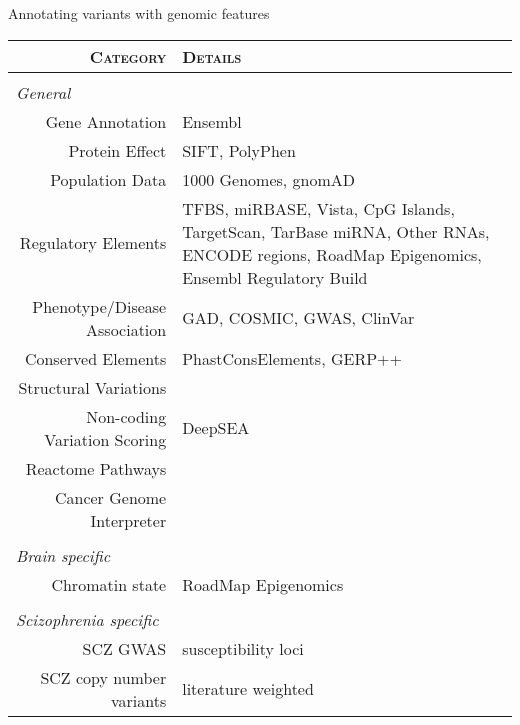 \documentclass[usenames,dvipsnames]{beamer}
\begin{document}
\begin{frame}[label=annotations]{Annotating variants with genomic features}
\tiny

\begin{tabular}{rp{2in}}
\scshape{Category} & \scshape{Details}\\
\hline
&\\
\multicolumn{2}{l}{\textit{General}} \\
\hline
\rowcolor{Yellow}
Gene Annotation & Ensembl\\
\rowcolor{Dandelion}
Protein Effect & SIFT, PolyPhen\\
\rowcolor{Yellow}
Population Data & 1000 Genomes, gnomAD\\
\rowcolor{Dandelion}
Regulatory Elements & TFBS, miRBASE, Vista, CpG Islands, TargetScan, TarBase miRNA, Other RNAs, ENCODE regions, RoadMap Epigenomics, Ensembl Regulatory Build\\
\rowcolor{Yellow}
Phenotype/Disease Association & GAD, COSMIC, GWAS, ClinVar\\
\rowcolor{Dandelion}
Conserved Elements & PhastConsElements, GERP++\\
\rowcolor{Yellow}
Structural Variations &\\
\rowcolor{Dandelion}
Non-coding Variation Scoring & DeepSEA\\
\rowcolor{Yellow}
Reactome Pathways &\\
\rowcolor{Dandelion}
Cancer Genome Interpreter &\\
\hline
&\\
\multicolumn{2}{l}{\textit{Brain specific}} \\
\hline
\rowcolor{Yellow}
Chromatin state & RoadMap Epigenomics \\
\hline
&\\
\multicolumn{2}{l}{\textit{Scizophrenia specific}} \\
\hline
\rowcolor{Yellow}
SCZ GWAS & susceptibility loci \\
\rowcolor{Dandelion}
SCZ copy number variants & literature weighted\\
\hline
\end{tabular}
\end{frame}

\end{document}
